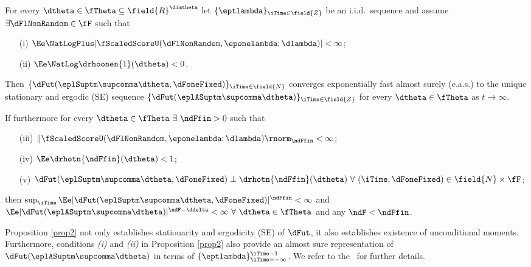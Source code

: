 \begin{prop} \label{prop2} 
For every $\dtheta \in  \fTheta\subseteq \field{R}^{\dimtheta}$ let  
$\{\eptlambda\}_{\iTime \in \field{Z}}$ be an i.i.d.\ sequence and assume
$\exists \dFlNonRandom \in  \fF$  such that 
\begin{enumerate}
    \item[(i)] $\Ee \NatLogPlus |\fScaledScoreU(\dFlNonRandom,\eponelambda;\dlambda)| <\infty$;
    \item[(ii)] $\Ee \NatLog \drhoonen{1}(\dtheta) < 0$.
\end{enumerate}
Then 
$\{ \dFut(\eplSuptm\supcomma\dtheta,\dFoneFixed) \}_{\iTime \in \field{N}}$ 
converges exponentially fast almost surely (e.a.s.) to the unique stationary and ergodic (SE) sequence 
$\{\dFut(\eplASuptm\supcomma\dtheta)\}_{\iTime \in \field{Z}}$ 
for every $\dtheta \in \fTheta$ as $t \to \infty$.

If furthermore for every $\dtheta \in \fTheta\ \exists \ \ndFfin  > 0$ such that 
\begin{enumerate}
    \item[(iii)] $\| \fScaledScoreU(\dFlNonRandom,\eponelambda;\dlambda) \rnorm_{\ndFfin} < \infty$;
    \item[(iv)] $\Ee \drhotn{\ndFfin}(\dtheta) < 1$;
    \item[(v)] $\dFut(\eplSuptm\supcomma\dtheta,\dFoneFixed) \perp \drhotn{\ndFfin}(\dtheta)
    \ \forall \ (\iTime,\dFoneFixed) \in \field{N} \times \fF$;
\end{enumerate}
then 
$\sup_{\iTime} \Ee| \dFut(\eplSuptm\supcomma\dtheta,\dFoneFixed) |^{\ndFfin} < \infty$
and  
$\Ee|\dFut(\eplASuptm\supcomma\dtheta)|^{\ndF-\ddelta} < \infty \ \forall \ \dtheta \in \fTheta$ and any $\ndF<\ndFfin$.
\end{prop}

Proposition \ref{prop2} not only establishes stationarity and ergodicity (SE) of $\dFut$, 
it also establishes existence of unconditional moments.
Furthermore, conditions \textit{(i)} and \textit{(ii)} in Proposition \ref{prop2} also provide an almost sure representation of $\dFut(\eplASuptm\supcomma\dtheta)$ in terms of $\{\eptlambda\}_{\iTime=-\infty}^{\iTime - 1}$. We refer to the \SupplementaryAppendix\ for further details. 



